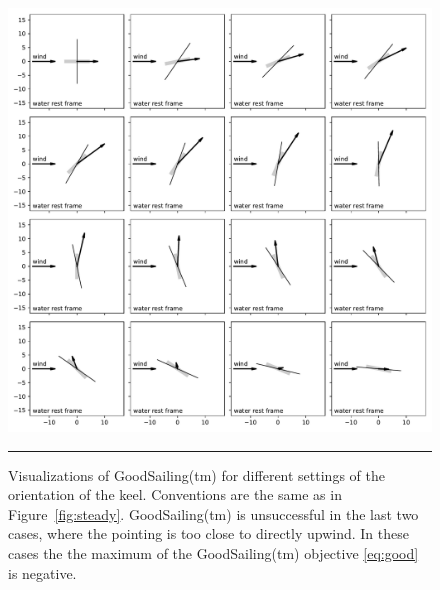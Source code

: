 \documentclass[letterpaper]{article}
\newcommand{\figref}[1]{Figure~\ref{#1}}
\newcommand{\figurerule}{\rule[1ex]{\textwidth}{0.2pt}}
\begin{document}
\begin{figure}[t!]
  \includegraphics[width=\textwidth]{good.pdf}
  \caption{Visualizations of GoodSailing(tm) for different settings of the orientation of the keel.
  Conventions are the same as in \figref{fig:steady}.
  GoodSailing(tm) is unsuccessful in the last two cases, where the pointing is too close to directly upwind.
  In these cases the the maximum of the GoodSailing(tm) objective \eqref{eq:good} is negative.\label{fig:good}}
  \figurerule
\end{figure}
\end{document}
